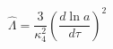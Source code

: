 \begin{equation} \label{ccc}
\hat \Lambda =\frac{3}{\kappa_4^2 }(\frac{d \ln a}{d\tau})^2
\end{equation}

